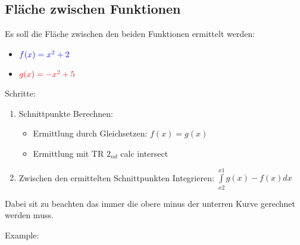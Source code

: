 \newpage
\subsection{Fläche zwischen Funktionen}

Es soll die Fläche zwischen den beiden Funktionen ermittelt werden:
\begin{itemize}
    \item $\textcolor{blue}{f(x) = x^2+2}$
    \item $\textcolor{red}{g(x) = -x^2+5}$
\end{itemize} 

\hfill \break
Schritte:
\begin{enumerate}
    \item Schnittpunkte Berechnen: \begin{itemize}
        \item Ermittlung durch Gleichsetzen: $f(x) = g(x)$
        \item Ermittlung mit TR $2_{nd}$ calc intersect
    \end{itemize}
    \item Zwischen den ermittelten Schnittpunkten Integrieren: $\int\limits_{x2}^{x1} g(x)-f(x)dx$
\end{enumerate}

\hfill \break
Dabei sit zu beachten das immer die obere minus der unterren Kurve gerechnet werden muss.

\hfill \break
Example:\\
